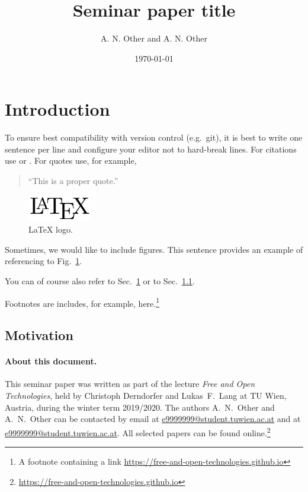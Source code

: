 \documentclass[a4paper, 11pt]{article}
\title{Seminar paper title}
\begin{document}
\date{\today}
\author{A. N. Other and A. N. Other}
\maketitle

\section{Introduction} \label{sec:intro}

To ensure best compatibility with version control (e.g.\ git), it is best to write one sentence per line and configure your editor not to hard-break lines.
For citations use \cite{BakSchaLewRotBla11} or \cite[p.\ 6--8]{BakSchaLewRotBla11}.
For quotes use, for example,
\begin{quote}
	``This is a proper quote.'' \cite[p.\ 6]{BakSchaLewRotBla11}
\end{quote}

\begin{figure}[t]
	\centering
	\includegraphics[width=0.25\textwidth]{figures/logo.png}
\caption{LaTeX logo.} \label{fig:logo}
\end{figure}

Sometimes, we would like to include figures.
This sentence provides an example of referencing to Fig.~\ref{fig:logo}.

You can of course also refer to Sec.~\ref{sec:intro} or to Sec.~\ref{sec:intro:motivation}.

Footnotes are includes, for example, here.\footnote{A footnote containing a link \url{https://free-and-open-technologies.github.io}}

\lipsum[1]

\subsection{Motivation} \label{sec:intro:motivation}

\lipsum[2-4]




\paragraph{About this document.} This seminar paper was written as part of the lecture \emph{Free and Open Technologies}, held by Christoph Derndorfer and Lukas~F.\ Lang at TU Wien, Austria, during the winter term 2019/2020.
The authors A.~N.~Other and A.~N.~Other can be contacted by email at \url{e9999999@student.tuwien.ac.at} and at \url{e9999999@student.tuwien.ac.at}.
All selected papers can be found online.\footnote{\url{https://free-and-open-technologies.github.io}}

\doclicenseThis
\end{document}
